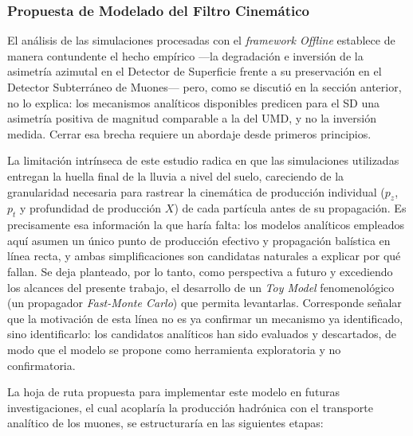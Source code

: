 \subsubsection{Propuesta de Modelado del Filtro Cinemático}
\label{subsec:fast_mc}

El análisis de las simulaciones procesadas con el \textit{framework Offline} establece de manera contundente el hecho empírico —la degradación e inversión de la asimetría azimutal en el Detector de Superficie frente a su preservación en el Detector Subterráneo de Muones— pero, como se discutió en la sección anterior, no lo explica: los mecanismos analíticos disponibles predicen para el SD una asimetría positiva de magnitud comparable a la del UMD, y no la inversión medida. Cerrar esa brecha requiere un abordaje desde primeros principios.

La limitación intrínseca de este estudio radica en que las simulaciones utilizadas entregan la huella final de la lluvia a nivel del suelo, careciendo de la granularidad necesaria para rastrear la cinemática de producción individual ($p_z$, $p_t$ y profundidad de producción $X$) de cada partícula antes de su propagación. Es precisamente esa información la que haría falta: los modelos analíticos empleados aquí asumen un único punto de producción efectivo y propagación balística en línea recta, y ambas simplificaciones son candidatas naturales a explicar por qué fallan. Se deja planteado, por lo tanto, como perspectiva a futuro y excediendo los alcances del presente trabajo, el desarrollo de un \textit{Toy Model} fenomenológico (un propagador \textit{Fast-Monte Carlo}) que permita levantarlas. Corresponde señalar que la motivación de esta línea no es ya confirmar un mecanismo ya identificado, sino identificarlo: los candidatos analíticos han sido evaluados y descartados, de modo que el modelo se propone como herramienta exploratoria y no confirmatoria.

La hoja de ruta propuesta para implementar este modelo en futuras investigaciones, el cual acoplaría la producción hadrónica con el transporte analítico de los muones, se estructuraría en las siguientes etapas:

